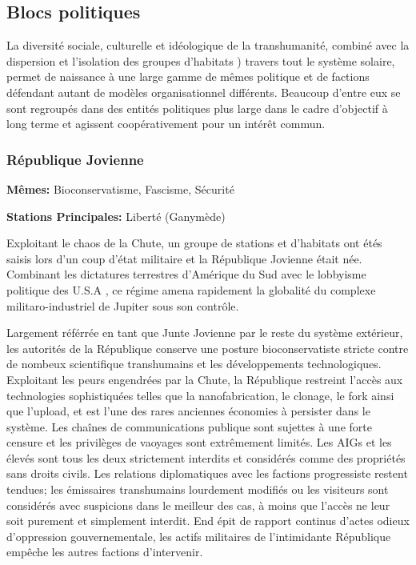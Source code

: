                            \subsection{Blocs politiques} \label{sec:political-blocs-1} 

                           La diversité sociale, culturelle et idéologique de la transhumanité, combiné avec la dispersion et l'isolation des groupes d'habitats ) travers tout le système solaire, permet de naissance à une large gamme de mêmes politique et de factions défendant autant de modèles organisationnel différents. Beaucoup d'entre eux se sont regroupés dans des entités politiques plus large dans le cadre d'objectif à long terme et agissent coopérativement pour un intérêt commun. 

                           \subsubsection{République Jovienne} \label{sec:jovian-republic} 

                           \textbf{Mêmes:} Bioconservatisme, Fascisme, Sécurité 

                           \textbf{Stations Principales: } Liberté (Ganymède) 

                           Exploitant le chaos de la Chute, un groupe de stations et d'habitats ont étés saisis lors d'un coup d'état militaire et la République Jovienne était née. Combinant les dictatures terrestres d'Amérique du Sud avec le lobbyisme politique des U.S.A , ce régime amena rapidement la globalité du complexe militaro-industriel de Jupiter sous son contrôle. 

                           Largement référrée en tant que Junte Jovienne par le reste du système extérieur, les autorités de la République conserve une posture bioconservatiste stricte contre de nombeux scientifique transhumains et les développements technologiques. Exploitant les peurs engendrées par la Chute, la République restreint l'accès aux technologies sophistiquées telles que la nanofabrication, le clonage, le fork ainsi que l'upload, et est l'une des rares anciennes économies à persister dans le système. Les chaînes de communications publique sont sujettes à une forte censure et les privilèges de vaoyages sont extrêmement limités. Les AIGs et les élevés sont tous les deux strictement interdits et considérés comme des propriétés sans droits civils. Les relations diplomatiques avec les factions progressiste restent tendues; les émissaires transhumains lourdement modifiés ou les visiteurs sont considérés avec suspicions dans le meilleur des cas, à moins que l'accès ne leur soit purement et simplement interdit. End épit de rapport continus d'actes odieux d'oppression gouvernementale, les actifs militaires de l'intimidante République empêche les autres factions d'intervenir. 

